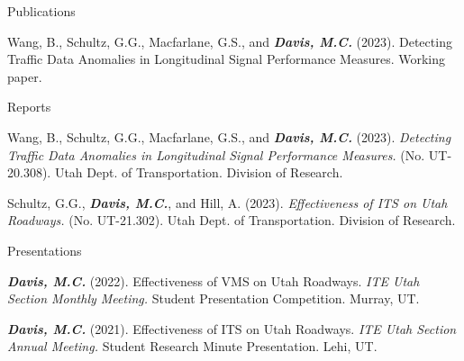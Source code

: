 \documentclass{resume} %
\begin{document}
\begin{rSection}{Publications}

Wang, B., Schultz, G.G., Macfarlane, G.S., and {\bf \em Davis, M.C.} (2023). {Detecting Traffic Data Anomalies in Longitudinal Signal Performance Measures.} Working paper.

\end{rSection}



\begin{rSection}{Reports}

Wang, B., Schultz, G.G., Macfarlane, G.S., and {\bf \em Davis, M.C.} (2023). {\em Detecting Traffic Data Anomalies in Longitudinal Signal Performance Measures.} (No. UT-20.308). Utah Dept. of Transportation. Division of Research.

Schultz, G.G., {\bf \em Davis, M.C.}, and Hill, A. (2023). {\em Effectiveness of ITS on Utah Roadways.} (No. UT-21.302). Utah Dept. of Transportation. Division of Research. 

\end{rSection}

\begin{rSection}{Presentations}

{\bf \em Davis, M.C.} (2022). {Effectiveness of VMS on Utah Roadways.} {\em ITE Utah Section Monthly Meeting.} Student Presentation Competition. Murray, UT.

{\bf \em Davis, M.C.} (2021). {Effectiveness of ITS on Utah Roadways.} {\em ITE Utah Section Annual Meeting.} Student Research Minute Presentation. Lehi, UT. 

\end{rSection}


\end{document}
